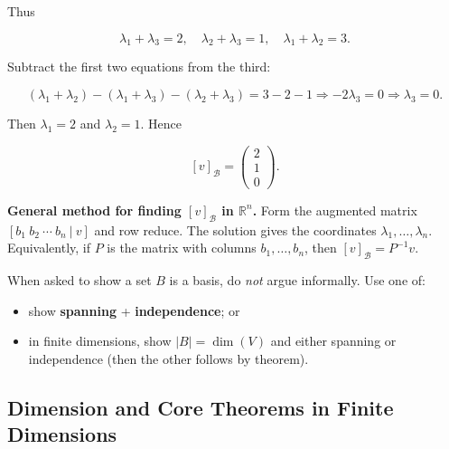 \begin{examplebox}
Thus

\[
\lambda_1+\lambda_3=2,\quad \lambda_2+\lambda_3=1,\quad \lambda_1+\lambda_2=3.
\]

Subtract the first two equations from the third:

\[
(\lambda_1+\lambda_2)-(\lambda_1+\lambda_3)-(\lambda_2+\lambda_3)=3-2-1 \Rightarrow -2\lambda_3=0 \Rightarrow \lambda_3=0.
\]

Then $\lambda_1=2$ and $\lambda_2=1$. Hence

\[
[v]_{\mathcal{B}}=\begin{pmatrix}2\\1\\0\end{pmatrix}.
\]

\end{examplebox}

\begin{policynote}
\textbf{General method for finding $[v]_{\mathcal{B}}$ in $\mathbb{R}^n$.}
Form the augmented matrix $[b_1\ b_2\ \cdots\ b_n\ |\ v]$ and row reduce.
The solution gives the coordinates $\lambda_1,\ldots,\lambda_n$.
Equivalently, if $P$ is the matrix with columns $b_1,\ldots,b_n$, then $[v]_{\mathcal{B}}=P^{-1}v$.
\end{policynote}

\begin{examtip}

When asked to show a set $B$ is a basis, do \emph{not} argue informally. Use one of:

\begin{itemize}

\item show \textbf{spanning} + \textbf{independence}; or

\item in finite dimensions, show $|B|=\dim(V)$ and either spanning or independence (then the other follows by theorem).

\end{itemize}

\end{examtip}


\subsection{Dimension and Core Theorems in Finite Dimensions}

